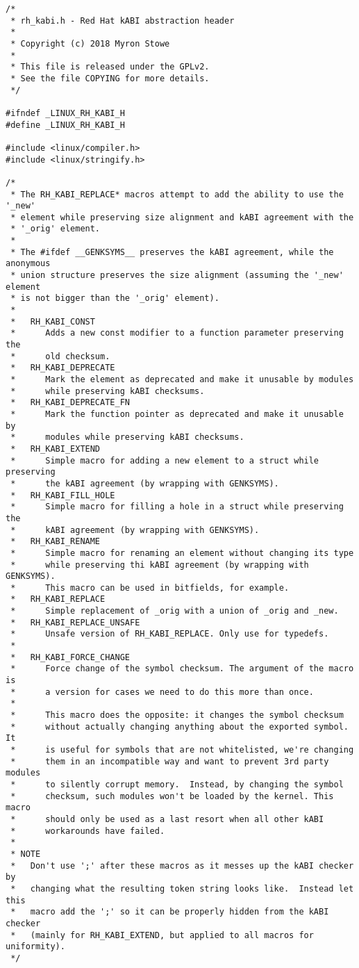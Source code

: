 \documentclass[10pt,oneside,english]{book}
\begin{document}
\begin{lstlisting}
/*
 * rh_kabi.h - Red Hat kABI abstraction header
 *
 * Copyright (c) 2018 Myron Stowe
 *
 * This file is released under the GPLv2.
 * See the file COPYING for more details.
 */

#ifndef _LINUX_RH_KABI_H
#define _LINUX_RH_KABI_H

#include <linux/compiler.h>
#include <linux/stringify.h>

/*
 * The RH_KABI_REPLACE* macros attempt to add the ability to use the '_new'
 * element while preserving size alignment and kABI agreement with the
 * '_orig' element.
 *
 * The #ifdef __GENKSYMS__ preserves the kABI agreement, while the anonymous
 * union structure preserves the size alignment (assuming the '_new' element
 * is not bigger than the '_orig' element).
 *
 *   RH_KABI_CONST
 *      Adds a new const modifier to a function parameter preserving the
 *      old checksum.
 *   RH_KABI_DEPRECATE
 *      Mark the element as deprecated and make it unusable by modules
 *      while preserving kABI checksums.
 *   RH_KABI_DEPRECATE_FN
 *      Mark the function pointer as deprecated and make it unusable by
 *      modules while preserving kABI checksums.
 *   RH_KABI_EXTEND
 *      Simple macro for adding a new element to a struct while preserving
 *      the kABI agreement (by wrapping with GENKSYMS).
 *   RH_KABI_FILL_HOLE
 *      Simple macro for filling a hole in a struct while preserving the
 *      kABI agreement (by wrapping with GENKSYMS).
 *   RH_KABI_RENAME
 *      Simple macro for renaming an element without changing its type
 *      while preserving thi kABI agreement (by wrapping with GENKSYMS).
 *      This macro can be used in bitfields, for example.
 *   RH_KABI_REPLACE
 *      Simple replacement of _orig with a union of _orig and _new.
 *   RH_KABI_REPLACE_UNSAFE
 *      Unsafe version of RH_KABI_REPLACE. Only use for typedefs.
 *
 *   RH_KABI_FORCE_CHANGE
 *      Force change of the symbol checksum. The argument of the macro is
 *      a version for cases we need to do this more than once.
 *
 *      This macro does the opposite: it changes the symbol checksum
 *      without actually changing anything about the exported symbol. It
 *      is useful for symbols that are not whitelisted, we're changing
 *      them in an incompatible way and want to prevent 3rd party modules
 *      to silently corrupt memory.  Instead, by changing the symbol
 *      checksum, such modules won't be loaded by the kernel. This macro
 *      should only be used as a last resort when all other kABI
 *      workarounds have failed.
 *
 * NOTE
 *   Don't use ';' after these macros as it messes up the kABI checker by
 *   changing what the resulting token string looks like.  Instead let this
 *   macro add the ';' so it can be properly hidden from the kABI checker
 *   (mainly for RH_KABI_EXTEND, but applied to all macros for uniformity).
 */


\end{lstlisting}
\end{document}
